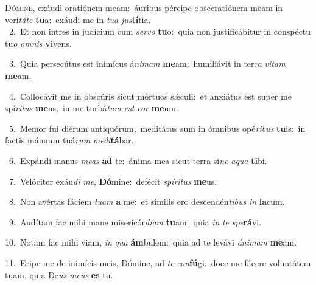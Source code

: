 \lettrine{\initial\textcolor{\initialcolor}{D}}{ómine,} exáudi oratiónem meam:~\dagger áuribus pércipe obsecratiónem meam in veri\-\textit{tá}\-\textit{te} \textbf{tu}\-a:~\star exáudi me in \textit{tu}\-\textit{a} \textit{jus}\-\textbf{tí}tia.\\
{\numbfont\textcolor{\numbcolor}{~2.}}~Et non intres in judícium cum \textit{ser}\-\textit{vo} \textbf{tu}\-o:~\star quia non justificábitur in conspéctu tu\textit{o} \textit{om}\-\textit{nis} \textbf{vi}\-vens.\par
{\numbfont\textcolor{\numbcolor}{~3.}}~Quia persecútus est inimícus á\-\textit{ni}\-\textit{mam} \textbf{me}\-am:~\star humiliávit in ter\textit{ra} \textit{vi}\-\textit{tam} \textbf{me}\-am.\par
{\numbfont\textcolor{\numbcolor}{~4.}}~Collocávit me in obscúris sicut mórtuos sǽculi:~\dagger et anxiátus est super me spí\-\textit{ri}\-\textit{tus} \textbf{me}\-us,~\star in me turbá\textit{tum} \textit{est} \textit{cor} \textbf{me}\-um.\par
{\numbfont\textcolor{\numbcolor}{~5.}}~Memor fui diérum antiquórum,~\dagger meditátus sum in ómnibus opé\-\textit{ri}\-\textit{bus} \textbf{tu}\-is:~\star in factis mánuum tuá\textit{rum} \textit{me}\-\textit{di}\textbf{tá}bar.\par
{\numbfont\textcolor{\numbcolor}{~6.}}~Expándi manus \textit{me}\-\textit{as} \textbf{ad} te:~\star ánima mea sicut terra si\textit{ne} \textit{a}\-\textit{qua} \textbf{ti}\-bi.\par
{\numbfont\textcolor{\numbcolor}{~7.}}~Velóciter exáu\textit{di} \textit{me}\-, \textbf{Dó}\-mine:~\star defécit \textit{spí}\-\textit{ri}\textit{tus} \textbf{me}\-us.\par
{\numbfont\textcolor{\numbcolor}{~8.}}~Non avértas fáciem \textit{tu}\-\textit{am} \textbf{a} me:~\star et símilis ero descendén\-\textit{ti}\-\textit{bus} \textit{in} \textbf{la}\-cum.\par
{\numbfont\textcolor{\numbcolor}{~9.}}~Audítam fac mihi mane misericór\-\textit{di}\-\textit{am} \textbf{tu}\-am:~\star quia \textit{in} \textit{te} \textit{spe}\-\textbf{rá}vi.\par
{\numbfont\textcolor{\numbcolor}{10.}}~Notam fac mihi viam, \textit{in} \textit{qua} \textbf{ám}\-bulem:~\star quia ad te levávi \textit{á}\-\textit{ni}\textit{mam} \textbf{me}\-am.\par
{\numbfont\textcolor{\numbcolor}{11.}}~Eripe me de inimícis meis, Dómine, ad \textit{te} \textit{con}\-\textbf{fú}gi:~\star doce me fácere voluntátem tuam, quia De\textit{us} \textit{me}\-\textit{us} \textbf{es} tu.\par
